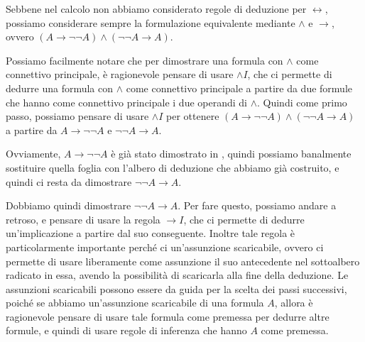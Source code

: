 Sebbene nel calcolo non abbiamo considerato regole di deduzione per \(\leftrightarrow\), possiamo considerare sempre la formulazione equivalente mediante \(\land\) e \(\to\), ovvero \((A \to \neg \neg A) \land (\neg \neg A \to A)\).

Possiamo facilmente notare che per dimostrare una formula con \(\land\) come connettivo principale, è ragionevole pensare di usare \(\land I\), che ci permette di dedurre una formula con \(\land\) come connettivo principale a partire da due formule che hanno come connettivo principale i due operandi di \(\land\). Quindi come primo passo, possiamo pensare di usare \(\land I\) per ottenere \((A \to \neg \neg A) \land (\neg \neg A \to A)\) a partire da \(A \to \neg \neg A\) e \(\neg \neg A \to A\).

\begin{prooftree}
\end{prooftree}

Ovviamente, \(A \to \neg \neg A\) è già stato dimostrato in , quindi possiamo banalmente sostituire quella foglia con l'albero di deduzione che abbiamo già costruito, e quindi ci resta da dimostrare \(\neg \neg A \to A\).

\begin{prooftree}
\end{prooftree}

Dobbiamo quindi dimostrare \(\neg \neg A \to A\). Per fare questo, possiamo andare a retroso, e pensare di usare la regola \(\to I\), che ci permette di dedurre un'implicazione a partire dal suo conseguente. Inoltre tale regola è particolarmente importante perché ci  un'assunzione scaricabile, ovvero ci permette di usare liberamente come assunzione il suo antecedente nel sottoalbero radicato in essa, avendo la possibilità di scaricarla alla fine della deduzione. Le assunzioni scaricabili possono essere da guida per la scelta dei passi successivi, poiché se abbiamo un'assunzione scaricabile di una formula \(A\), allora è ragionevole pensare di usare tale formula come premessa per dedurre altre formule, e quindi di usare regole di inferenza che hanno \(A\) come premessa.

